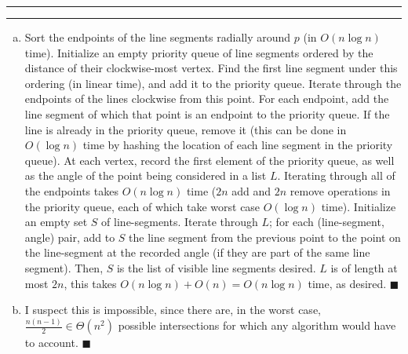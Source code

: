 \documentclass[11pt]{article}
\newcounter{questionCounter}
\newcounter{partCounter}[questionCounter]
\newenvironment{question}[2][\arabic{questionCounter}]{%
    \setcounter{partCounter}{0}%
    \vspace{.25in} \hrule \vspace{0.5em}%
        \noindent{\bf #2}%
    \vspace{0.8em} \hrule \vspace{.10in}%
    \addtocounter{questionCounter}{1}%
}{}
\begin{document}
\begin{question}{Visibility}
\begin{enumerate}[(a)]
\item Sort the endpoints of the line segments radially around $p$ (in
$O(n \log n)$ time). Initialize an empty priority queue of line segments
ordered by the distance of their
clockwise-most vertex. Find the first line segment under this ordering (in
linear time), and add it to the priority queue. Iterate through the endpoints
of the lines clockwise from this point. For each endpoint, add the line
segment of which that point is an endpoint to the priority queue. If the line
is already in the priority queue, remove it (this can be done in $O(\log n)$
time by hashing the location of each line segment in the priority queue).
At each vertex, record the first element of the priority queue,
as well as the angle of the point being considered in a list $L$. Iterating through all of
the endpoints takes $O(n \log n)$ time ($2n$ add and $2n$ remove operations in
the priority queue, each of which take worst case $O(\log n)$ time).
Initialize an empty set $S$ of line-segments. Iterate through $L$; for each
(line-segment, angle) pair, add to $S$ the line segment from the previous
point to the point on the line-segment at the recorded angle (if they are part
of the same line segment). Then, $S$ is the list of visible line segments
desired. $L$ is of length at most $2n$, this takes
$O(n \log n) + O(n) = O(n \log n)$ time, as desired. \qquad $\blacksquare$

\item I suspect this is impossible, since there are, in the worst case,
$\frac{n(n - 1)}{2} \in \Theta(n^2)$ possible intersections for which any
algorithm would have to account. \qquad $\blacksquare$

\end{enumerate}
\end{question}
\end{document}
